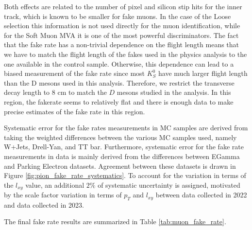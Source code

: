 Both effects are related to the number of pixel and silicon stip hits for the inner track, which is known to be smaller for fake muons. In the case of the Loose selection this information is not used directly for the muon identification, while for the Soft Muon MVA it is one of the most powerful discriminators. The fact that the fake rate has a non-trivial dependence on the flight length means that we have to match the flight length of the fakes used in the physics analysis to the one available in the control sample. Otherwise, this dependence can lead to a biased measurement of the fake rate since most $K_S^0$ have much larger flight length than the D mesons used in this analysis. Therefore, we restrict the transverse decay length to 8 cm to match the $D$ mesons studied in the analysis. In this region, the fakerate seems to relatively flat and there is enough data to make precise estimates of the fake rate in this region. 

Systematic error for the fake rates measurements in MC samples are derived from taking the weighted differences between the various MC samples used, namely W+Jets, Drell-Yan, and TT bar. Furthermore, systematic error for the fake rate measurements in data is mainly derived  from the differences between EGamma and Parking Electron datasets. Agreement between these datasets is drawn in Figure \ref{fig:pion_fake_rate_systematics}. To account for the variation in terms of the $l_{xy}$ value, an additional $2\%$ of systematic uncertainty is assigned, motivated by the scale factor variation in terms of $p_T$ and $l_{xy}$ between data collected in 2022 and data collected in 2023. 

The final fake rate results are summarized in Table \ref{tab:muon_fake_rate}.

